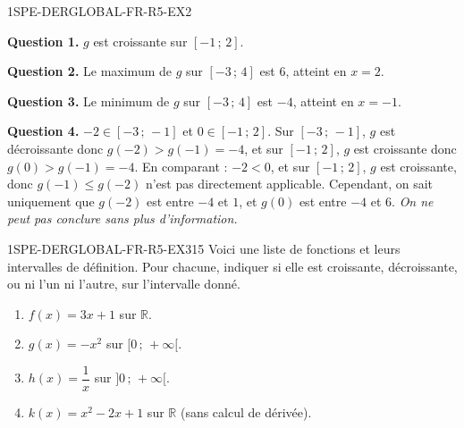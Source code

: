 \begin{corrige}{1SPE-DERGLOBAL-FR-R5-EX2}

\textbf{Question 1.}
$g$ est croissante sur $[-1\,;\,2]$.

\textbf{Question 2.}
Le maximum de $g$ sur $[-3\,;\,4]$ est $6$, atteint en $x = 2$.

\textbf{Question 3.}
Le minimum de $g$ sur $[-3\,;\,4]$ est $-4$, atteint en $x = -1$.

\textbf{Question 4.}
$-2 \in [-3\,;\,-1]$ et $0 \in [-1\,;\,2]$. Sur $[-3\,;\,-1]$, $g$ est décroissante donc $g(-2) > g(-1) = -4$, et sur $[-1\,;\,2]$, $g$ est croissante donc $g(0) > g(-1) = -4$. En comparant : $-2 < 0$, et sur $[-1\,;\,2]$, $g$ est croissante, donc $g(-1) \leqslant g(-2)$ n'est pas directement applicable. Cependant, on sait uniquement que $g(-2)$ est entre $-4$ et $1$, et $g(0)$ est entre $-4$ et $6$. \textit{On ne peut pas conclure sans plus d'information.}

\end{corrige}


\begin{exercice}{1SPE-DERGLOBAL-FR-R5-EX3}{1}{5}
Voici une liste de fonctions et leurs intervalles de définition. Pour chacune, indiquer si elle est croissante, décroissante, ou ni l'un ni l'autre, sur l'intervalle donné.
\begin{enumerate}
  \item $f(x) = 3x + 1$ sur $\mathbb{R}$.
  \item $g(x) = -x^2$ sur $[0\,;\,+\infty[$.
  \item $h(x) = \dfrac{1}{x}$ sur $]0\,;\,+\infty[$.
  \item $k(x) = x^2 - 2x + 1$ sur $\mathbb{R}$ (sans calcul de dérivée).
\end{enumerate}
\end{exercice}


